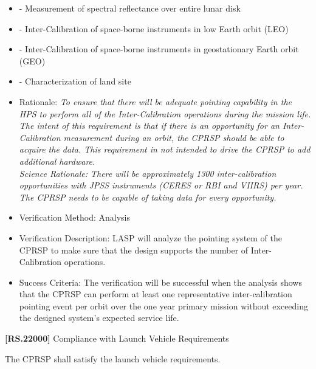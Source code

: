 \begin{itemize}
\item{} - Measurement of spectral reflectance over entire lunar disk

\item{} - Inter-Calibration of space-borne instruments in low Earth orbit (LEO)

\item{} - Inter-Calibration of space-borne instruments in geostationary Earth orbit (GEO)

\item{} - Characterization of land site

\item{} Rationale: \emph{To ensure that there will be adequate pointing capability in the HPS to perform all of the Inter-Calibration operations during the mission life. The intent of this requirement is that if there is an opportunity for an Inter-Calibration measurement during an orbit, the CPRSP should be able to acquire the data. This requirement in not intended to drive the CPRSP to add additional hardware.\\
Science Rationale: There will be approximately 1300 inter-calibration opportunities with JPSS instruments (CERES or RBI and VIIRS) per year. The CPRSP needs to be capable of taking data for every opportunity.}

\item{} Verification Method: Analysis

\item{} Verification Description: \gls{LASP} will analyze the \gls{point}ing system of the \gls{CPRSP} to make sure that the design supports the number of Inter-Calibration operations.

\item{} Success Criteria: The verification will be successful when the \gls{analysis} shows that the \gls{CPRSP} can perform at least one representative inter-calibration \gls{point}ing event per orbit over the one year primary mission without exceeding the designed system's expected service life.

\end{itemize}

\textbf{[RS.22000]} Compliance with Launch Vehicle Requirements

The \gls{CPRSP} shall satisfy the launch vehicle requirements.

